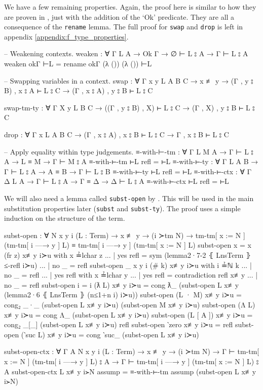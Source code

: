 \documentclass[logo,bsc,singlespacing,parskip,online]{infthesis}
\begin{document}
We have a few remaining properties. Again, the proof here is similar to how they are proven in
\citet{wadler_programming_2022}, just with the addition of the `Ok' predicate. They are all a
consequence of the \texttt{rename} lemma. The full proof for \texttt{swap} and \texttt{drop} is left
in appendix \ref{appendix:f_type_properties}.
\begin{code}
  -- Weakening contexts.
  weaken : ∀ {Γ L A} → Ok Γ → ∅ ⊢ L ⦂ A → Γ ⊢ L ⦂ A
  weaken okΓ ⊢L = rename okΓ (λ ()) (λ ()) ⊢L

  -- Swapping variables in a context.
  swap : ∀ {Γ x y L A B C}
    → x ≢ y
    → (Γ , y ⦂ B) , x ⦂ A ⊢ L ⦂ C
    → (Γ , x ⦂ A) , y ⦂ B ⊢ L ⦂ C

  swap-tm-ty : ∀ {Γ X y L B C}
    → ((Γ , y ⦂ B) , X) ⊢ L ⦂ C
    → (Γ , X) , y ⦂ B ⊢ L ⦂ C

  drop : ∀ {Γ x L A B C}
    → (Γ , x ⦂ A) , x ⦂ B ⊢ L ⦂ C
    → Γ , x ⦂ B ⊢ L ⦂ C

  -- Apply equality within type judgements.
  ≡-with-⊢-tm : ∀ {Γ L M A} → Γ ⊢ L ⦂ A → L ≡ M → Γ ⊢ M ⦂ A
  ≡-with-⊢-tm ⊢L refl = ⊢L
  ≡-with-⊢-ty : ∀ {Γ L A B} → Γ ⊢ L ⦂ A → A ≡ B → Γ ⊢ L ⦂ B
  ≡-with-⊢-ty ⊢L refl = ⊢L
  ≡-with-⊢-ctx : ∀ {Γ Δ L A} → Γ ⊢ L ⦂ A → Γ ≡ Δ → Δ ⊢ L ⦂ A
  ≡-with-⊢-ctx ⊢L refl = ⊢L
\end{code}

We will also need a lemma called \texttt{subst-open} by \citet{chargueraud_locally_2012}. This will
be used in the main substitution properties later (\texttt{subst} and \texttt{subst-ty}). The proof
uses a simple induction on the structure of the term.
\begin{code}
  subst-open : ∀ {N x y i} (L : Term)
    → x ≢ y → (i ≻tm N)
    → tm-tm[ x := N ] (tm-tm[ i —→ y ] L)
      ≡ tm-tm[ i —→ y ] (tm-tm[ x := N ] L)
  subst-open {x = x} (fr z) x≢y i≻u with x ≟lchar z
  ... | yes refl = sym (lemma2·7-2 ⦃ LnsTerm ⦄ ≤-refl i≻u)
  ... | no  _    = refl
  subst-open {_} {x} {y} {i} (# k) x≢y i≻u with i ≟ℕ k
  ... | no  _ = refl
  ... | yes refl with x ≟lchar y
  ...    | yes refl = contradiction refl x≢y
  ...    | no  _    = refl
  subst-open {i = i} (ƛ L) x≢y i≻u = cong ƛ_
    (subst-open L x≢y (lemma2·6 ⦃ LnsTerm ⦄ (n≤1+n i) i≻u))
  subst-open (L · M) x≢y i≻u = cong₂ _·_
    (subst-open L x≢y i≻u) (subst-open M x≢y i≻u)
  subst-open (Λ L) x≢y i≻u = cong Λ_ (subst-open L x≢y i≻u)
  subst-open (L [ A ]) x≢y i≻u =
    cong₂ _[_] (subst-open L x≢y i≻u) refl
  subst-open ‵zero x≢y i≻u = refl
  subst-open (‵suc L) x≢y i≻u = cong ‵suc_ (subst-open L x≢y i≻u)

  subst-open-ctx : ∀ {Γ A N x y i} (L : Term)
    → x ≢ y → (i ≻tm N)
    → Γ ⊢ tm-tm[ x := N ] (tm-tm[ i —→ y ] L) ⦂ A
    → Γ ⊢ tm-tm[ i —→ y ] (tm-tm[ x := N ] L) ⦂ A
  subst-open-ctx L x≢y i≻N assump =
    ≡-with-⊢-tm assump (subst-open L x≢y i≻N)
\end{code}
\end{document}
